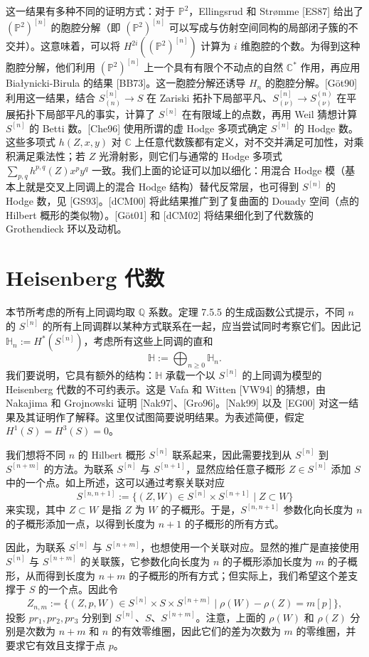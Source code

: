 这一结果有多种不同的证明方式：对于 $\mathbb P^2$，Ellingsrud 和 Strømme [ES87] 给出了 $(\mathbb P^2)^{[n]}$ 的胞腔分解（即 $(\mathbb P^2)^{[n]}$ 可以写成与仿射空间同构的局部闭子簇的不交并）。这意味着，可以将 $H^{2i}((\mathbb P^2)^{[n]})$ 计算为 $i$ 维胞腔的个数。为得到这种胞腔分解，他们利用 $(\mathbb P^2)^{[n]}$ 上一个具有有限个不动点的自然 $\mathbb C^*$ 作用，再应用 Białynicki-Birula 的结果 [BB73]。这一胞腔分解还诱导 $H_n$ 的胞腔分解。[Göt90] 利用这一结果，结合 $S_{(n)}^{[n]}\to S$ 在 Zariski 拓扑下局部平凡、$S_{(\nu)}^{[n]}\to S_{(\nu)}^{(n)}$ 在平展拓扑下局部平凡的事实，计算了 $S^{[n]}$ 在有限域上的点数，再用 Weil 猜想计算 $S^{[n]}$ 的 Betti 数。[Che96] 使用所谓的虚 Hodge 多项式确定 $S^{[n]}$ 的 Hodge 数。这些多项式 $h(Z,x,y)$ 对 $\mathbb C$ 上任意代数簇都有定义，对不交并满足可加性，对乘积满足乘法性；若 $Z$ 光滑射影，则它们与通常的 Hodge 多项式 $\sum_{p,q}h^{p,q}(Z)x^py^q$ 一致。我们上面的论证可以加以细化：用混合 Hodge 模（基本上就是交叉上同调上的混合 Hodge 结构）替代反常层，也可得到 $S^{[n]}$ 的 Hodge 数，见 [GS93]。[dCM00] 将此结果推广到了复曲面的 Douady 空间（点的 Hilbert 概形的类似物）。[Göt01] 和 [dCM02] 将结果细化到了代数簇的 Grothendieck 环以及动机。

\section{Heisenberg 代数}
本节所考虑的所有上同调均取 $\mathbb Q$ 系数。定理 7.5.5 的生成函数公式提示，不同 $n$ 的 $S^{[n]}$ 的所有上同调群以某种方式联系在一起，应当尝试同时考察它们。因此记 $\mathbb H_n:=H^*(S^{[n]})$，考虑所有这些上同调的直和
\[
\mathbb H:=\bigoplus_{n\geq0}\mathbb H_n.
\]
我们要说明，它具有额外的结构：$\mathbb H$ 承载一个以 $S^{[n]}$ 的上同调为模型的 Heisenberg 代数的不可约表示。这是 Vafa 和 Witten [VW94] 的猜想，由 Nakajima 和 Grojnowski 证明 [Nak97]、[Gro96]。[Nak99] 以及 [EG00] 对这一结果及其证明作了解释。这里仅试图简要说明结果。为表述简便，假定 $H^1(S)=H^3(S)=0$。

我们想将不同 $n$ 的 Hilbert 概形 $S^{[n]}$ 联系起来，因此需要找到从 $S^{[n]}$ 到 $S^{[n+m]}$ 的方法。为联系 $S^{[n]}$ 与 $S^{[n+1]}$，显然应给任意子概形 $Z\in S^{[n]}$ 添加 $S$ 中的一个点。如上所述，这可以通过考察关联对应
\[
S^{[n,n+1]}:=\{(Z,W)\in S^{[n]}\times S^{[n+1]}\mid Z\subset W\}
\]
来实现，其中 $Z\subset W$ 是指 $Z$ 为 $W$ 的子概形。于是，$S^{[n,n+1]}$ 参数化向长度为 $n$ 的子概形添加一点，以得到长度为 $n+1$ 的子概形的所有方式。

因此，为联系 $S^{[n]}$ 与 $S^{[n+m]}$，也想使用一个关联对应。显然的推广是直接使用 $S^{[n]}$ 与 $S^{[n+m]}$ 的关联簇，它参数化向长度为 $n$ 的子概形添加长度为 $m$ 的子概形，从而得到长度为 $n+m$ 的子概形的所有方式；但实际上，我们希望这个差支撑于 $S$ 的一个点。因此令
\[
Z_{n,m}:=\{(Z,p,W)\in S^{[n]}\times S\times S^{[n+m]}
\mid\rho(W)-\rho(Z)=m[p]\},
\]
投影 $pr_1,pr_2,pr_3$ 分别到 $S^{[n]}$、$S$、$S^{[n+m]}$。注意，上面的 $\rho(W)$ 和 $\rho(Z)$ 分别是次数为 $n+m$ 和 $n$ 的有效零维圈，因此它们的差为次数为 $m$ 的零维圈，并要求它有效且支撑于点 $p$。

